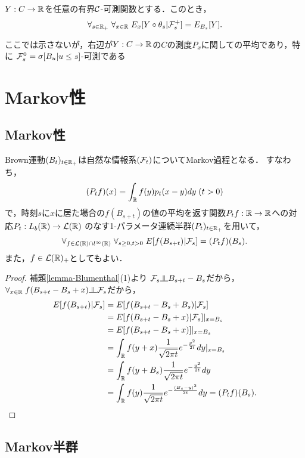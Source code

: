 \documentclass[uplatex,dvipdfmx]{jsreport}
\begin{document}
\begin{theorem}[Brown運動のMarkov性]
    $Y:C\to\mathbb{R}$を任意の有界$\mathcal{C}$-可測関数とする．このとき，
    \[\forall_{s\in\mathbb{R}_+}\;\forall_{x\in\mathbb{R}}\;E_x[Y\circ\theta_s|\mathcal{F}^+_s]=E_{B_s}[Y].\]
\end{theorem}
\begin{remarks}
    ここでは示さないが，右辺が$Y:C\to\mathbb{R}$の$C$の測度$P_x$に関しての平均であり，特に
    $\mathcal{F}_s^0=\sigma[B_u|u\le s]$-可測である
\end{remarks}

\section{Markov性}

\subsection{Markov性}

\begin{theorem}
    Brown運動$(B_t)_{t\in\mathbb{R}_+}$は自然な情報系$(\mathcal{F}_t)$についてMarkov過程となる．
    すなわち，
    \[(P_tf)(x)=\int_{\mathbb{R}} f(y)p_t(x-y)dy\;(t>0)\]
    で，時刻$s$に$x$に居た場合の$f(B_{s+t})$の値の平均を返す関数$P_tf:\mathbb{R}\to\mathbb{R}$への対応$P_t:L_b(\mathbb{R})\to\mathcal{L}(\mathbb{R})$
    のなす1-パラメータ連続半群$(P_t)_{t\in\mathbb{R}_+}$を用いて，
    \[\forall_{f\in\mathcal{L}(\mathbb{R})\cap l^\infty(\mathbb{R})}\;\forall_{s\ge0,t>0}\;E[f(B_{s+t})|\mathcal{F}_s]=(P_tf)(B_s).\]
    また，$f\in\mathcal{L}(\mathbb{R})_+$としてもよい．
\end{theorem}
\begin{proof}
    補題\ref{lemma-Blumenthal}(1)より
    $\F_s\indep B_{s+t}-B_s$だから，$\forall_{x\in\R}\;f(B_{s+t}-B_s+x)\indep\F_s$だから，
    \begin{align*}
        E[f(B_{s+t})|\mathcal{F}_s]&=E[f(B_{s+t}-B_s+B_s)|\mathcal{F}_s]\\
        &=E[f(B_{s+t}-B_s+x)|\mathcal{F}_s]|_{x=B_s}\\
        &=E[f(B_{s+t}-B_s+x)]|_{x=B_s}\\
        &=\int_{\mathbb{R}} f(y+x)\frac{1}{\sqrt{2\pi t}}e^{-\frac{y^2}{2t}}dy|_{x=B_s}\\
        &=\int_{\mathbb{R}} f(y+B_s)\frac{1}{\sqrt{2\pi t}}e^{-\frac{y^2}{2t}}dy\\
        &=\int_{\mathbb{R}} f(y)\frac{1}{\sqrt{2\pi t}}e^{-\frac{(B_s-y)^2}{2t}}dy=(P_tf)(B_s).
    \end{align*}
\end{proof}

\subsection{Markov半群}
\end{document}
